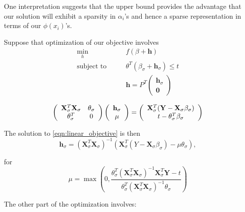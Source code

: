 \documentclass{article}
\renewcommand{\vec}[1]{\mathbf{#1}}
\begin{document}
One interpretation suggests that the upper bound provides the advantage that our solution will exhibit a sparsity in $\alpha_i$'s and hence a sparse representation in terms of our $\phi(x_i)$'s.

Suppose that optimization of our objective involves
\begin{align} \label{eqn:linear_objective}
\min_h \qquad & f(\beta + \vec{h}) \\
\text{subject to} \qquad & \theta^T (\beta_\sigma + \vec{h}_\sigma) \leq t \nonumber \\
& \vec{h} = P^T
\left( \begin{array}{c}
  \vec{h}_\sigma \nonumber \\
  \vec{0}
\end{array} \right)
\end{align}

\begin{equation} \label{eqn:KKT}
\left( \begin{array}{c c}
\vec{X}^T_\sigma \vec{X}_\sigma & \theta_\sigma \\
\theta_\sigma^T & 0
\end{array} \right)
\left( \begin{array}{c}
\vec{h}_\sigma \\
\mu
\end{array} \right)
=
\left( \begin{array}{c}
\vec{X}_\sigma^T (\vec{Y} - \vec{X}_\sigma \beta_\sigma) \\
t - \theta_\sigma^T \beta_\sigma
\end{array} \right)
\end{equation}


The solution to \eqref{eqn:linear_objective} is then
\begin{equation}
\vec{h}_\sigma = (\vec{X}_\sigma^T \vec{X}_\sigma)^{-1} (\vec{X}_\sigma^T (Y - \vec{X}_\sigma \beta_\sigma) - \mu \theta_\sigma),
\end{equation}

for
\[
\mu = \max \left( 0, \frac{\theta_\sigma^T (\vec{X}_\sigma^T \vec{X}_\sigma)^{-1} \vec{X}_\sigma^T \vec{Y} - t}{\theta_\sigma^T (\vec{X}_\sigma^T \vec{X}_\sigma)^{-1} \theta_\sigma} \right)
\]


The other part of the optimization involves:
\end{document}
